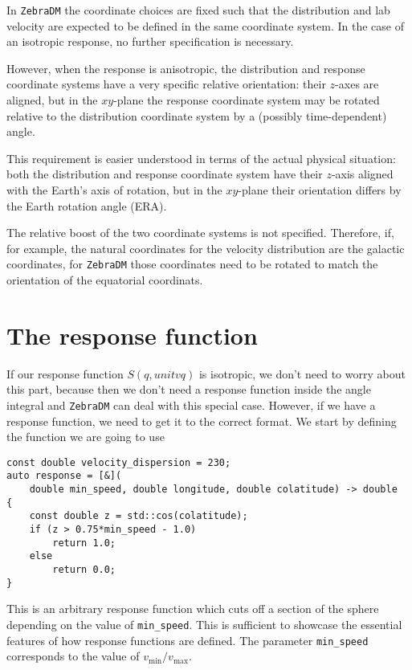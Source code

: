 \documentclass{article}
\begin{document}
In \texttt{ZebraDM} the coordinate choices are fixed such that the distribution and lab velocity are expected to be defined in the same coordinate system. In the case of an isotropic response, no further specification is necessary. 

However, when the response is anisotropic, the distribution and response coordinate systems have a very specific relative orientation: their $z$-axes are aligned, but in the $xy$-plane the response coordinate system may be rotated relative to the distribution coordinate system by a (possibly time-dependent) angle.

This requirement is easier understood in terms of the actual physical situation: both the distribution and response coordinate system have their $z$-axis aligned with the Earth's axis of rotation, but in the $xy$-plane their orientation differs by the Earth rotation angle (ERA).

The relative boost of the two coordinate systems is not specified. Therefore, if, for example, the natural coordinates for the velocity distribution are the galactic coordinates, for \texttt{ZebraDM} those coordinates need to be rotated to match the orientation of the equatorial coordinats.

\section{The response function}

If our response function $S(q, unitv{q})$ is isotropic, we don't need to worry about this part, because then we don't need a response function inside the angle integral and \texttt{ZebraDM} can deal with this special case. However, if we have a response function, we need to get it to the correct format. We start by defining the function we are going to use
\begin{verbatim}
const double velocity_dispersion = 230;
auto response = [&](
    double min_speed, double longitude, double colatitude) -> double
{
    const double z = std::cos(colatitude);
    if (z > 0.75*min_speed - 1.0)
        return 1.0;
    else
        return 0.0;
}
\end{verbatim}
This is an arbitrary response function which cuts off a section of the sphere depending on the value of \texttt{min_speed}. This is sufficient to showcase the essential features of how response functions are defined. The parameter \texttt{min_speed} corresponds to the value of $v_\text{min}/v_\text{max}$.
\end{document}
